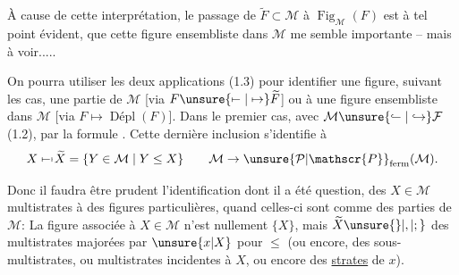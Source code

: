 À cause de cette interprétation, le passage de $\widetilde F\subset\mathcal{M}$ à $\operatorname{Fig}_{\mathcal{M}}(F)$ est à tel point évident, que  cette figure ensembliste dans $\mathcal{M}$ me semble  importante -- mais à voir.....


On pourra utiliser les deux applications (1.3) pour identifier une figure, suivant les cas,  une partie de $\mathcal{M}$ [via $F\unsure{\mapstochar\relbar|\mapsto}\widetilde F$] ou à une figure ensembliste dans $\mathcal{M}$ [via $F\mapsto\operatorname{\text{Dépl}}(F)$]. Dans le premier cas,  avec $\mathcal{M}\unsure{\lhook\joinrel\relbar|\hookrightarrow}\mathcal{F}$ (1.2)\deleted{\unsure{(}}, par la formule . Cette dernière inclusion s'identifie à
\[
X\mathrel{\mapstochar\relbar\mapstochar}\widetilde X=\{Y\in\mathcal{M}\mid Y\leq X\}
\qquad \mathcal{M}\to\unsure{\mathcal{P}|\mathscr{P}}_{\mathrm{ferm}}(\mathcal{M}).
\]

Donc il faudra être prudent   l'identification dont il a été question, des $X\in\mathcal{M}$  multistrates à des figures particulières, quand celles-ci sont  comme des parties de $\mathcal{M}$: La figure associée à $X\in\mathcal{M}$ n'est nullement $\{X\}$, mais $\widetilde X\unsure{\rbrace|,|;}$   des multistrates majorées par $\unsure{x|X}$ pour $\leq$ (ou encore, des sous-multistrates, ou multistrates incidentes à $X$, ou encore des  \uline{strates} de $x$).
